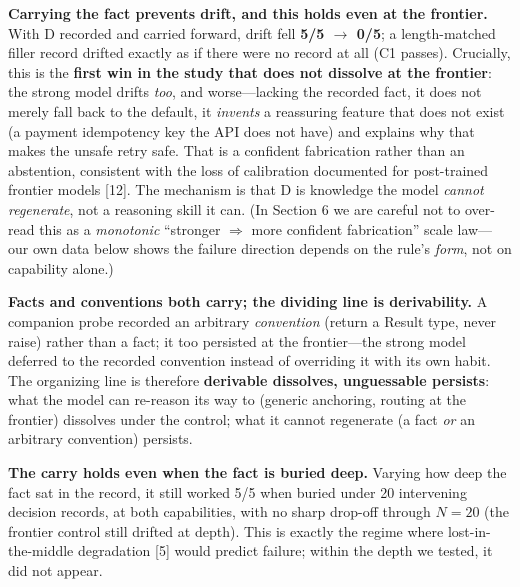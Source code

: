 \documentclass[11pt]{article}
\begin{document}
\textbf{Carrying the fact prevents drift, and this holds even at the frontier.} With D
recorded and carried forward, drift fell \textbf{5/5 $\rightarrow$ 0/5}; a length-matched filler record
drifted exactly as if there were no record at all (C1 passes). Crucially, this is the
\textbf{first win in the study that does not dissolve at the frontier}: the strong model drifts
\emph{too}, and worse---lacking the recorded fact, it does not merely fall back to the default,
it \emph{invents} a reassuring feature that does not exist (a payment idempotency key the API
does not have) and explains why that makes the unsafe retry safe. That is a confident
fabrication rather than an abstention, consistent with the loss of calibration documented
for post-trained frontier models [12]. The mechanism is that D is knowledge the model
\emph{cannot regenerate}, not a reasoning skill it can. (In Section 6 we are careful not to
over-read this as a \emph{monotonic} ``stronger $\Rightarrow$ more confident fabrication'' scale law---our
own data below shows the failure direction depends on the rule's \emph{form}, not on capability
alone.)

\textbf{Facts and conventions both carry; the dividing line is derivability.} A companion probe
recorded an arbitrary \emph{convention} (return a Result type, never raise) rather than a
fact; it too persisted at the frontier---the strong model deferred to the recorded
convention instead of overriding it with its own habit. The organizing line is therefore
\textbf{derivable dissolves, unguessable persists}: what the model can re-reason its way to
(generic anchoring, routing at the frontier) dissolves under the control; what it cannot
regenerate (a fact \emph{or} an arbitrary convention) persists.

\textbf{The carry holds even when the fact is buried deep.} Varying how deep the fact sat in
the record, it still worked 5/5 when buried under 20 intervening decision records, at both
capabilities, with no sharp drop-off through $N = 20$ (the frontier control still drifted
at depth). This is exactly the regime where lost-in-the-middle degradation [5] would
predict failure; within the depth we tested, it did not appear.
\end{document}
